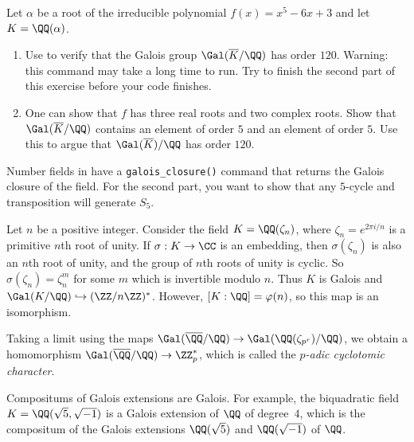 \begin{exercise}
  Let $\alpha$ be a root of the irreducible polynomial $f(x) = x^5 - 6x + 3$ and
  let $K = \QQ(\alpha)$.
  \begin{enumerate}
    \item
    Use {\Sage} to verify that the Galois group $\Gal(\overline{K}/\QQ)$
    has order $120$.
    Warning: this command may take a long time to run.
    Try to finish the second part of this exercise before your code
    finishes.
  
    \item
    One can show that $f$ has three real roots and two complex roots.
    Show that $\Gal(\overline{K}/\QQ)$ contains an element of order $5$ and
    an element of order $5$. Use this to argue that $\Gal(\overline{K})/\QQ$
    has order $120$.
  \end{enumerate}
  \begin{hint}
    Number fields in {\Sage} have a {\tt galois\_closure()} command that
    returns the Galois closure of the field.
    For the second part, you want to show that any $5$-cycle and transposition
    will generate $S_5$.
  \end{hint}
\end{exercise}

\begin{example}
  Let $n$ be a positive integer. Consider the field $K=\QQ(\zeta_n)$,
  where $\zeta_n=e^{2\pi i/n}$ is a primitive $n$th root of unity.  If
  $\sigma:K\to \CC$ is an embedding, then $\sigma(\zeta_n)$ is also an
  $n$th root of unity, and the group of $n$th roots of unity is cyclic.
  So $\sigma(\zeta_n) = \zeta_n^m$ for some $m$ which is invertible
  modulo $n$.  Thus $K$ is Galois and $\Gal(K/\QQ) \hookrightarrow (\ZZ/n\ZZ)^*$.
  However, $[K:\QQ] = \varphi(n)$, so this map is an isomorphism.
\end{example}

\begin{remark}
  Taking a limit using the maps $\Gal(\overline{\QQ}/\QQ)\to
  \Gal(\QQ(\zeta_{p^r})/\QQ)$, we obtain a homomorphism $\Gal(\overline{\QQ}/\QQ)\to
  \ZZ_p^*$, which is called the {\em $p$-adic cyclotomic character}.
\end{remark}

Compositums of Galois extensions are Galois.  For example, the
biquadratic field $K=\QQ(\sqrt{5},\sqrt{-1})$ is a Galois
extension of $\QQ$ of degree~$4$, which is the compositum
of the Galois extensions $\QQ(\sqrt{5})$ and $\QQ(\sqrt{-1})$ of $\QQ$.

